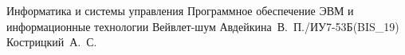 \makeresearchtitle
{Информатика и системы управления} %
{Программное обеспечение ЭВМ и информационные технологии} %
{Вейвлет-шум} %
{Авдейкина~В.~П./ИУ7-53Б(BIS\_19)} %
{Кострицкий~А.~С.} %
{} %

